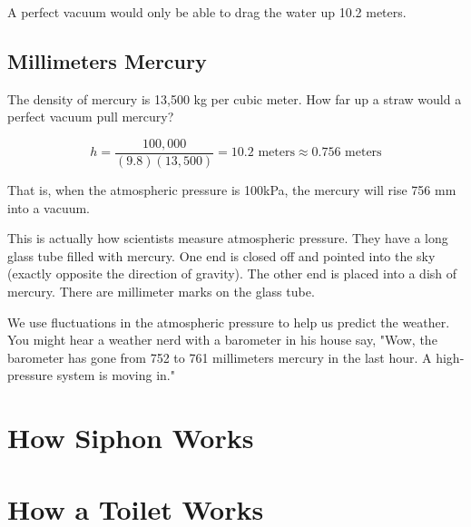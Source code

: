 A perfect vacuum would only be able to drag the water up 10.2 meters.

\subsection{Millimeters Mercury}

The density of mercury is 13,500 kg per cubic meter.  How far up a straw would a perfect vacuum pull mercury? 

$$h = \frac{100,000}{(9.8)(13,500)} = 10.2 \text{ meters} \approx 0.756 \text{ meters}$$

That is, when the atmospheric pressure is 100kPa,  the mercury will rise 756 mm into a vacuum.

This is actually how scientists measure atmospheric pressure.   They have a long glass tube filled with mercury.  One end is closed off and pointed into the sky (exactly opposite the direction of gravity).  The other end is placed into a dish of mercury.  There are millimeter marks on the glass tube.

We use fluctuations in the atmospheric pressure to help us predict the weather.  You might hear a weather nerd with a barometer in his house say, "Wow, the barometer has gone from 752 to 761 millimeters mercury in the last hour.  A high-pressure system is moving in." 


\section{How Siphon Works}

\section{How a Toilet Works}
